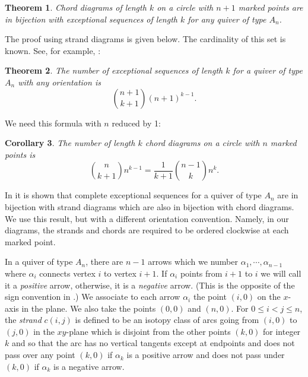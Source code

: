 \documentclass[11pt]{amsart}
\newtheorem{thm}{Theorem}[section]
\newtheorem{cor}[thm]{Corollary}
\theoremstyle{definition}
\theoremstyle{remark}
\numberwithin{equation}{section}
\begin{document}
\begin{thm}\label{thm: chord diagrams and exc seq of type An}
Chord diagrams of length $k$ on a circle with $n+1$ marked points are in bijection with exceptional sequences of length $k$ for any quiver of type $A_n$.
\end{thm}

The proof using strand diagrams is given below. The cardinality of this set is known. See, for example, \cite{I:prob}:

\begin{thm}\label{thm: number of exc seq for An-1}
The number of exceptional sequences of length $k$ for a quiver of type $A_n$ with any orientation is
\[
	\binom{n+1}{k+1}(n+1)^{k-1}.
\]
\end{thm}

We need this formula with $n$ reduced by 1:

\begin{cor}\label{cor: number of chord diagrams of length k}
The number of length $k$ chord diagrams on a circle with $n$ marked points is
\[
	\binom{n}{k+1}n^{k-1}=\frac1{k+1}\binom{n-1}k n^k.
\]
\end{cor}


In \cite{GIMO} it is shown that complete exceptional sequences for a quiver of type $A_n$ are in bijection with strand diagrams which are also in bijection with chord diagrams. We use this result, but with a different orientation convention. Namely, in our diagrams, the strands and chords are required to be ordered clockwise at each marked point.




In a quiver of type $A_n$, there are $n-1$ arrows which we number $\alpha_1,\cdots,\alpha_{n-1}$ where $\alpha_i$ connects vertex $i$ to vertex $i+1$. If $\alpha_i$ points from $i+1$ to $i$ we will call it a \emph{positive} arrow, otherwise, it is a \emph{negative} arrow. (This is the opposite of the sign convention in \cite{GIMO}.) We associate to each arrow $\alpha_i$ the point $(i,0)$ on the $x$-axis in the plane. We also take the points $(0,0)$ and $(n,0)$. For $0\le i<j\le n$, the \emph{strand} $c(i,j)$ is defined to be an isotopy class of arcs going from $(i,0)$ to $(j,0)$ in the $xy$-plane which is disjoint from the other points $(k,0)$ for integer $k$ and so that the arc has no vertical tangents except at endpoints and does not pass over any point $(k,0)$ if $\alpha_k$ is a positive arrow and does not pass under $(k,0)$ if $\alpha_k$ is a negative arrow.
\end{document}
